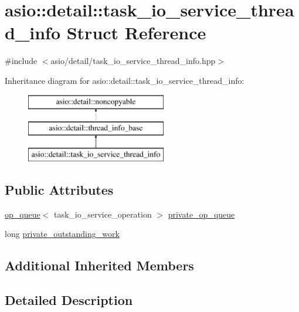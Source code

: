 \hypertarget{structasio_1_1detail_1_1task__io__service__thread__info}{}\section{asio\+:\+:detail\+:\+:task\+\_\+io\+\_\+service\+\_\+thread\+\_\+info Struct Reference}
\label{structasio_1_1detail_1_1task__io__service__thread__info}


{\ttfamily \#include $<$asio/detail/task\+\_\+io\+\_\+service\+\_\+thread\+\_\+info.\+hpp$>$}

Inheritance diagram for asio\+:\+:detail\+:\+:task\+\_\+io\+\_\+service\+\_\+thread\+\_\+info\+:\begin{figure}[H]
\begin{center}
\leavevmode
\includegraphics[height=3.000000cm]{structasio_1_1detail_1_1task__io__service__thread__info}
\end{center}
\end{figure}
\subsection*{Public Attributes}
\begin{DoxyCompactItemize}
\item 
\hyperlink{classasio_1_1detail_1_1op__queue}{op\+\_\+queue}$<$ task\+\_\+io\+\_\+service\+\_\+operation $>$ \hyperlink{structasio_1_1detail_1_1task__io__service__thread__info_a997a840dcb5281af5be3aef23e750799}{private\+\_\+op\+\_\+queue}
\item 
long \hyperlink{structasio_1_1detail_1_1task__io__service__thread__info_a676e6bfbe7c7042cd3f556829e01cfdb}{private\+\_\+outstanding\+\_\+work}
\end{DoxyCompactItemize}
\subsection*{Additional Inherited Members}


\subsection{Detailed Description}


